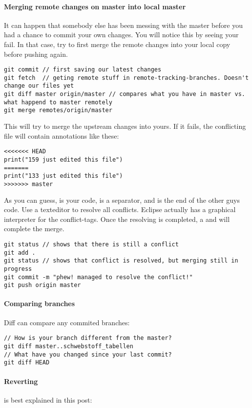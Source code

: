 \paragraph{Merging remote changes on master into local master} It can happen that somebody else has been messing with the master before you had a chance to commit your own changes. You will notice this by seeing your  fail. In that case, try to first merge the remote changes into your local copy before pushing again. 
\begin{lstlisting}
git commit // first saving our latest changes
git fetch  // geting remote stuff in remote-tracking-branches. Doesn't change our files yet
git diff master origin/master // compares what you have in master vs. what happend to master remotely
git merge remotes/origin/master
\end{lstlisting}
This will try to merge the upstream changes into yours. If it fails, the conflicting file will contain annotations like these: 
\begin{lstlisting}
<<<<<<< HEAD
print("159 just edited this file")
=======
print("133 just edited this file")
>>>>>>> master
\end{lstlisting}
As you can guess,  is your code, \inlinecode{===} is a separator, and  is the end of the other guys code. 
Use a texteditor to resolve all conflicts. Eclipse actually has a graphical interpreter for the conflict-tags. Once the resolving is completed, a  and  will complete the merge.
\begin{lstlisting}
git status // shows that there is still a conflict
git add .
git status // shows that conflict is resolved, but merging still in progress
git commit -m "phew! managed to resolve the conflict!"
git push origin master
\end{lstlisting}


\paragraph{Comparing branches} Diff can compare any commited branches: 
\begin{lstlisting}
// How is your branch different from the master?
git diff master..schwebstoff_tabellen
// What have you changed since your last commit?
git diff HEAD
\end{lstlisting}

\paragraph{Reverting} is best explained in this post: 



